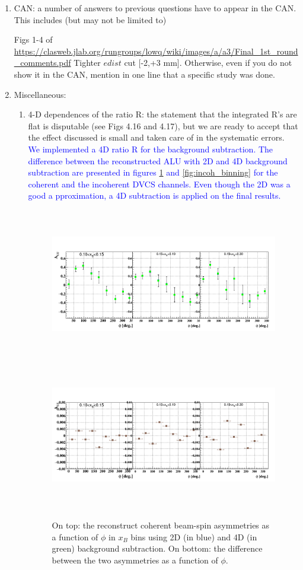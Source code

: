 \begin{enumerate}
\item CAN: a number of answers to previous questions have to appear in the CAN.  
This includes (but may not be limited to) 

Figs 1-4 of \url{https://clasweb.jlab.org/rungroups/lowq/wiki/images/a/a3/Final_1st_round_comments.pdf} 
Tighter $edist$ cut [-2,+3 mm].
Otherwise, even if you do not show it in the CAN, mention in one line that a 
specific study was done.
\item Miscellaneous:
   \begin{enumerate}
      \item 4-D dependences of the ratio R: the statement that the integrated R's 
    are flat is disputable (see Figs 4.16 and 4.17), but we are ready to accept 
    that the effect discussed is small and taken care of in the systematic 
    errors.\\
    \textcolor{blue}{We implemented a 4D ratio R for the background 
       subtraction. The difference between the reconstructed ALU with 2D and 4D 
       background subtraction are presented in figures \ref{fig:coh_binning} 
       and \ref{fig:incoh_binning} for the coherent and the incoherent DVCS 
       channels. Even though the 2D was a good a pproximation, a 4D subtraction 
    is applied on the final results.} 
    \begin{figure}[tbp]
    \includegraphics[height=6.6cm]{fig/BSA_Coherent_xB.png}
    \includegraphics[height=6.6cm]{fig/diff_BSA_Coherent_xB.png}
    \caption{On top: the reconstruct coherent beam-spin asymmetries as a 
    function of $\phi$ in $x_{B}$ bins using 2D (in blue) and 4D (in green) 
 background subtraction.  On bottom: the difference between the two asymmetries 
 as a function of $\phi$.}
    \label{fig:coh_binning}
    \end{figure}            


\end{enumerate}
\end{enumerate}
